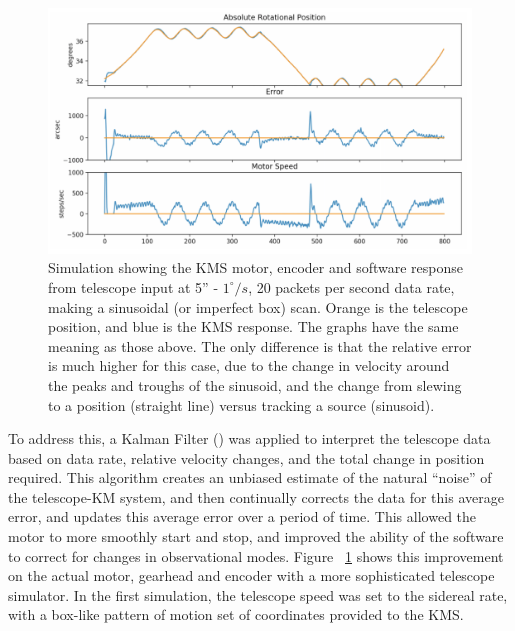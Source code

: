\documentclass[manuscript]{aastex}
\begin{document}
\newpage
\begin{figure}[H]
	\centering
	\captionsetup{width=\textwidth}
	\includegraphics[width=\textwidth]{km8.png}%
	\caption[Simulated KMS Performance, Realistic Box Scan]{Simulation showing the KMS motor, encoder and software response from telescope input at 5'' - $1^{\circ}/s$, 20 packets per second data rate, making a sinusoidal (or imperfect box) scan. Orange is the telescope position, and blue is the KMS response. The graphs have the same meaning as those above. The only difference is that the relative error is much higher for this case, due to the change in velocity around the peaks and troughs of the sinusoid, and the change from slewing to a position (straight line) versus tracking a source (sinusoid).}%
	\label{fig:km8}%
\end{figure}

To address this, a Kalman Filter (\cite{Chung-Ming2004}) was applied to interpret the telescope data based on data rate, relative velocity changes, and the total change in position required. This algorithm creates an unbiased estimate of the natural ``noise'' of the telescope-KM system, and then continually corrects the data for this average error, and updates this average error over a period of time. This allowed the motor to more smoothly start and stop, and improved the ability of the software to correct for changes in observational modes. Figure ~\ref{fig:km8} shows this improvement on the actual motor, gearhead and encoder with a more sophisticated telescope simulator. In the first simulation, the telescope speed was set to the sidereal rate, with a box-like pattern of motion set of coordinates provided to the KMS. 
\end{document}

